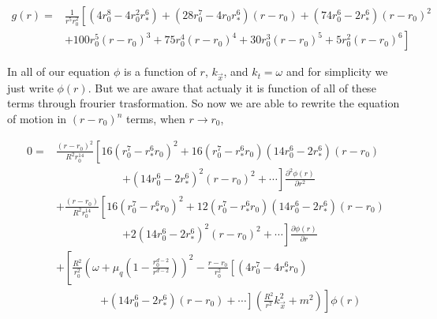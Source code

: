 \begin{align}
    g(r) =& \frac{1}{r^5r_0^2} \left[ (4r_0^8-4r_0^2r_*^6) + (28r_0^7-4r_0r_*^6)(r-r_0) + (74r_0^6-2r_*^6)(r-r_0)^2 \right. \nonumber\\
          &  \left. + 100r_0^5(r-r_0)^3 + 75r_0^4(r-r_0)^4 + 30r_0^3(r-r_0)^5 + 5r_0^2(r-r_0)^6 \right]
\end{align}

In all of our equation $\phi$ is a function of $r$, $k_{\vec{x}}$, and $k_t=\omega$ and for simplicity we just write $\phi(r)$. But we are aware that actualy it is function of all of these terms through frourier trasformation. So now we are able to rewrite the equation of motion in $(r-r_0)^n$ terms, when $r \rightarrow r_0$,

\begin{align}
    0 =& \frac{(r-r_0)^2}{R^2r_0^{14}}\left[16(r_0^7-r_*^6r_0)^2 + 16(r_0^7-r_*^6r_0)(14r_0^6-2r_*^6)(r-r_0) \right. \nonumber\\
       & \qquad \qquad \qquad  \left. + (14r_0^6-2r_*^6)^2(r-r_0)^2 + \cdots \right] \frac{\partial^2\phi(r)}{\partial r^2} \nonumber\\
       & + \frac{(r-r_0)}{R^2r_0^{14}}\left[16(r_0^7-r_*^6r_0)^2 + 12(r_0^7-r_*^6r_0)(14r_0^6-2r_*^6)(r-r_0) \right. \nonumber\\
       & \qquad \qquad \qquad \left. + 2(14r_0^6-2r_*^6)^2(r-r_0)^2 + \cdots \right] \frac{\partial\phi(r)}{\partial r} \nonumber\\
       & + \left[ \frac{R^2}{r_0^2}\left(\omega+\mu_q(1-\frac{r_0^{d-2}}{r^{d-2}})\right)^2 - \frac{r-r_0}{r_0^2} \left[(4r_0^7-4r_*^6r_0)\right.\right. \nonumber\\
       & \qquad \quad \quad \left.\left. + (14r_0^6-2r_*^6)(r-r_0) + \cdots \right] \left( \frac{R^2}{r^2}k_{\vec{x}}^2 + m^2 \right) \right] \phi(r)
\end{align}
